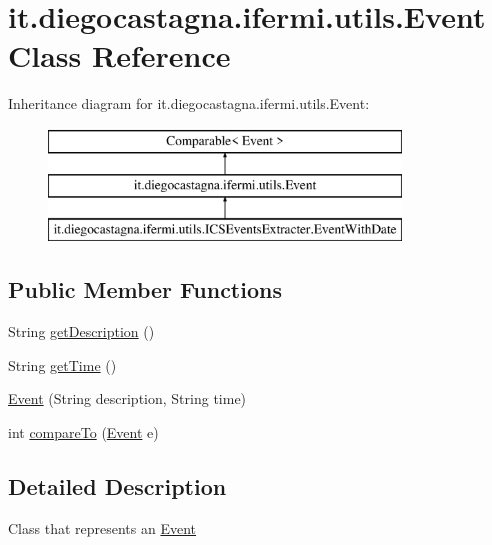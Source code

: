 \hypertarget{classit_1_1diegocastagna_1_1ifermi_1_1utils_1_1_event}{}\section{it.\+diegocastagna.\+ifermi.\+utils.\+Event Class Reference}
\label{classit_1_1diegocastagna_1_1ifermi_1_1utils_1_1_event}
Inheritance diagram for it.\+diegocastagna.\+ifermi.\+utils.\+Event\+:\begin{figure}[H]
\begin{center}
\leavevmode
\includegraphics[height=3.000000cm]{classit_1_1diegocastagna_1_1ifermi_1_1utils_1_1_event}
\end{center}
\end{figure}
\subsection*{Public Member Functions}
\begin{DoxyCompactItemize}
\item 
String \mbox{\hyperlink{classit_1_1diegocastagna_1_1ifermi_1_1utils_1_1_event_a232142d3530a740399e99326c133a360}{get\+Description}} ()
\item 
String \mbox{\hyperlink{classit_1_1diegocastagna_1_1ifermi_1_1utils_1_1_event_a1683039bf973560726a15eaf5638d0b8}{get\+Time}} ()
\item 
\mbox{\hyperlink{classit_1_1diegocastagna_1_1ifermi_1_1utils_1_1_event_a6a5971925ddbbd3de1dd3fdd16013f0a}{Event}} (String description, String time)
\item 
int \mbox{\hyperlink{classit_1_1diegocastagna_1_1ifermi_1_1utils_1_1_event_ac8673f7826033944f7b76b8e43fe480e}{compare\+To}} (\mbox{\hyperlink{classit_1_1diegocastagna_1_1ifermi_1_1utils_1_1_event}{Event}} e)
\end{DoxyCompactItemize}


\subsection{Detailed Description}
Class that represents an \mbox{\hyperlink{classit_1_1diegocastagna_1_1ifermi_1_1utils_1_1_event}{Event}} 

